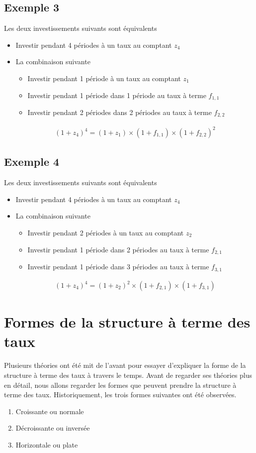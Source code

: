 \documentclass[letterpaper, 12pt]{article}
\newcommand{\1}{\mathds{1}}	%
\theoremstyle{definition}
\begin{document}
\subsection{Exemple 3}
Les deux investissements suivants sont équivalents
\begin{itemize}
\item Investir pendant 4 périodes à un taux au comptant $z_4$
\item La combinaison suivante
\begin{itemize}
\item Investir pendant 1 période à un taux au comptant $z_1$
\item Investir pendant 1 période dans 1 période au taux à terme $f_{1,1}$
\item Investir pendant 2 périodes dans 2 périodes au taux à terme $f_{2,2}$
\end{itemize}

\begin{align*}
(1+z_4)^4=(1+z_1) \times (1+f_{1,1}) \times (1+f_{2,2})^2
\end{align*}
\end{itemize}

\subsection{Exemple 4}
Les deux investissements suivants sont équivalents
\begin{itemize}
\item Investir pendant 4 périodes à un taux au comptant $z_4$
\item La combinaison suivante
\begin{itemize}
\item Investir pendant 2 périodes à un taux au comptant $z_2$
\item Investir pendant 1 période dans 2 périodes au taux à terme $f_{2,1}$
\item Investir pendant 1 période dans 3 périodes au taux à terme $f_{3,1}$
\end{itemize}
\begin{align*}
(1+z_4)^4=(1+z_2)^2 \times (1+f_{2,1}) \times (1+f_{3,1})
\end{align*}
\end{itemize}

\section{ Formes de la structure à terme des taux}
Plusieurs théories ont été mit de l'avant pour essayer d'expliquer la forme de la structure à terme des taux à travers le temps.  Avant de regarder ses théories plus en détail,  nous allons regarder les formes que peuvent prendre la structure à terme des taux.  Historiquement,  les trois formes suivantes ont été observées.
\begin{enumerate}
\item Croissante ou normale
\item Décroissante ou inversée
\item Horizontale ou plate
\end{enumerate} 
\end{document}
